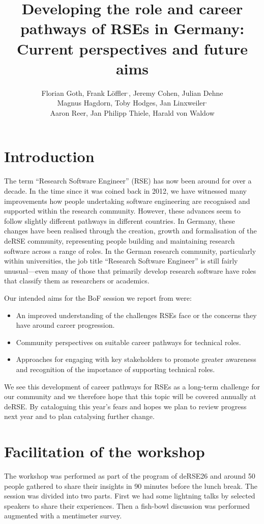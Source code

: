 \documentclass{eceasst}
\title{Developing the role and career pathways of RSEs in Germany: Current perspectives and future aims }
\author{
Florian Goth\authorOrcid{0000-0003-2707-4790}\authorRef{2},
Frank Löffler\authorOrcid{0000-0001-6643-6323}\authorRef{1}${}^,$\authorRef{3},
Jeremy Cohen\authorOrcid{0000-0003-4312-2537}\authorRef{4},
Julian Dehne\authorOrcid{0000-0001-9265-9619}\authorRef{5}\\
Magnus Hagdorn\authorOrcid{0000-0002-5076-4864}\authorRef{6},
Toby Hodges\authorOrcid{0000-0003-1766-456X}\authorRef{7},
Jan Linxweiler\authorOrcid{0000-0002-2755-5087}\authorRef{1}${}^,$\authorRef{7}\\
Aaron Reer\authorOrcid{0000-0000-0000-0000}\authorRef{5},
Jan Philipp Thiele\authorOrcid{0000-0002-8901-6660}\authorRef{8},
Harald von Waldow\authorOrcid{0000-0003-4800-2833}\authorRef{9}
} %
\institute{%
\autlabel{1} de-RSE e.V. --- Society for Research Software in Germany,\\
\autlabel{2} Institut für theoretische Physik 1, University of Würzburg, 97074, Würzburg, Germany,\\
\autlabel{3} Heinz Nixdorf Chair for Distributed Information Systems,\\ Friedrich Schiller University Jena, Germany,\\
\autlabel{4} Imperial College London, UK,\\
\autlabel{5} German Informatics Society, Berlin, Germany,\\
\autlabel{6} Charité Universitätsmedizin Berlin, Germany,\\
\autlabel{7} The Carpentries, USA,\\
\autlabel{8} Technische Universität Braunschweig, Germany,\\
\autlabel{9} Johann Heinrich von Thünen-Institut, Braunschweig, Germany\\
}
\begin{document}
\maketitle

\section{Introduction}
The term \enquote{Research Software Engineer} (RSE) has now been around for over a decade.
In the time since it was coined back in 2012, we have witnessed many improvements how people undertaking software engineering are recognised and supported within the research community.
However, these advances seem to follow slightly different pathways in different countries.
In Germany, these changes have been realised through the creation, growth and formalisation of the deRSE community, representing people building and maintaining research software across a range of roles.
In the German research community, particularly within universities, the job title \enquote{Research Software Engineer} is still fairly unusual---even many of those that primarily develop research software have roles that classify them as researchers or academics.

Our intended aims for the BoF session we report from were:
\begin{itemize}
\item An improved understanding of the challenges RSEs face or the concerns they have around career progression.
\item Community perspectives on suitable career pathways for technical roles.
\item Approaches for engaging with key stakeholders to promote greater awareness and recognition of the importance of supporting technical roles.
\end{itemize}
We see this development of career pathways for RSEs as a long-term challenge for our community and we therefore hope that this topic will be covered annually at deRSE\@.
By cataloguing this year's fears and hopes we plan to review progress next year and to plan catalysing further change.

\section{Facilitation of the workshop}
The workshop was performed as part of the program of deRSE26 and around 50 people gathered to share their  insights in
90 minutes before the lunch break.
The session was divided into two parts. First we had some lightning talks by selected speakers to share their experiences.
Then a fish-bowl discussion was performed augmented with a mentimeter survey.
\end{document}
